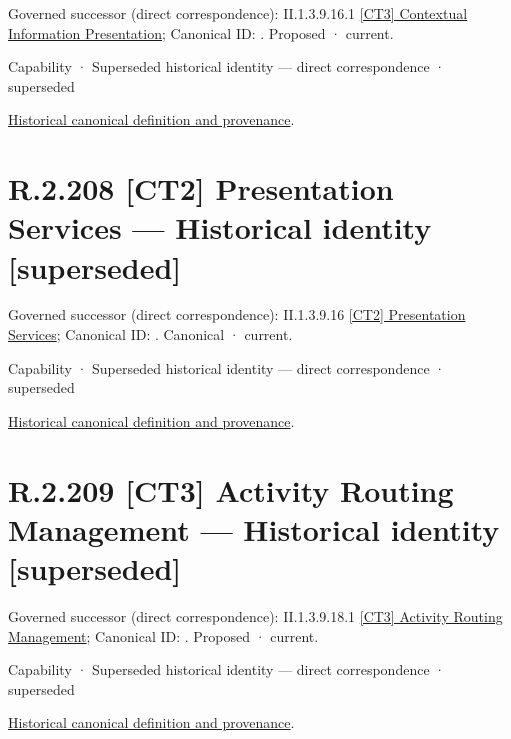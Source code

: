 {\small Governed successor (direct correspondence): II.1.3.9.16.1 \hyperref[element:9f900c53ae56488cad69e53c2205e898]{[CT3] Contextual Information Presentation}; Canonical ID: \texttt{}. Proposed · current.}\par
\label{element:e349d5f6a8774bbe8d150f9c51af770c}
{\small Capability · Superseded historical identity — direct correspondence · superseded}\par
\href{../../../../continuum/strategy/capability/e349d5f6a8774bbe8d150f9c51af770c.md}{Historical canonical definition and provenance}.\par
\section*{R.2.208 [CT2] Presentation Services — Historical identity [superseded]}
\label{navigation:R.2.208}

{\small Governed successor (direct correspondence): II.1.3.9.16 \hyperref[element:e9b6ba1917ba44cca7466444d0836c98]{[CT2] Presentation Services}; Canonical ID: \texttt{}. Canonical · current.}\par
\label{element:c89e7c8b277247d9965fdb534aad2d1f}
{\small Capability · Superseded historical identity — direct correspondence · superseded}\par
\href{../../../../continuum/strategy/capability/c89e7c8b277247d9965fdb534aad2d1f.md}{Historical canonical definition and provenance}.\par
\section*{R.2.209 [CT3] Activity Routing Management — Historical identity [superseded]}
\label{navigation:R.2.209}

{\small Governed successor (direct correspondence): II.1.3.9.18.1 \hyperref[element:27411c143e6e41ffba1af139fbbcd7e2]{[CT3] Activity Routing Management}; Canonical ID: \texttt{}. Proposed · current.}\par
\label{element:243ea93e7b7448fe97dc74f90bfc8946}
{\small Capability · Superseded historical identity — direct correspondence · superseded}\par
\href{../../../../continuum/strategy/capability/243ea93e7b7448fe97dc74f90bfc8946.md}{Historical canonical definition and provenance}.\par

